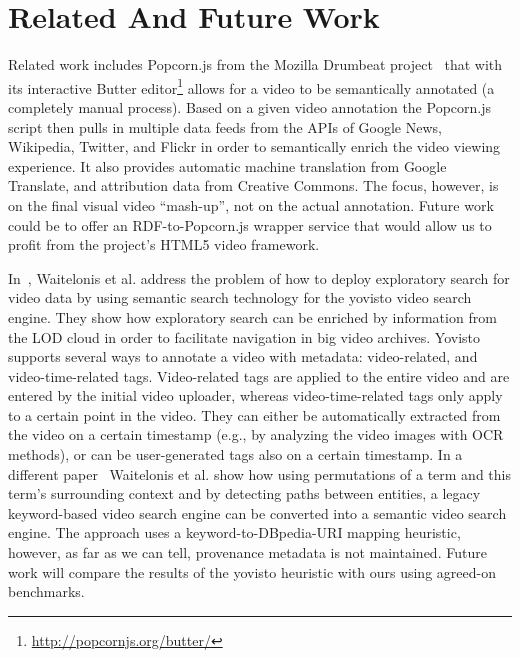 \documentclass{acm_proc_article-sp}
\begin{document}
\section{Related And Future Work}\label{sec:related}
Related work includes Popcorn.js from the Mozilla Drumbeat project~\cite{Drumbeat:Popcorn} that with its interactive Butter editor\footnote{\url{http://popcornjs.org/butter/}} allows for a video to be semantically annotated (a completely manual process). Based on a given video annotation the Popcorn.js script then pulls in multiple data feeds from the APIs of Google News, Wikipedia, Twitter, and Flickr in order to semantically enrich the video viewing experience. It also provides automatic machine translation from Google Translate, and attribution data from Creative Commons. The focus, however, is on the final visual video ``mash-up'', not on the actual annotation. Future work could be to offer an RDF-to-Popcorn.js wrapper service that would allow us to profit from the project's HTML5 video framework.

In~\cite{Sack:VideoSearch}, Waitelonis et al. address the problem of how to deploy exploratory search for video data by using semantic search technology for the yovisto video search engine. They show how exploratory search can be enriched by information from the LOD cloud in order to facilitate navigation in big video archives. Yovisto supports several ways to annotate a video with metadata: video-related, and video-time-related tags. Video-related tags are applied to the entire video and are entered by the initial video uploader, whereas video-time-related tags only apply to a certain point in the video. They can either be automatically extracted from the video on a certain timestamp (e.g., by analyzing the video images with OCR methods), or can be user-generated tags also on a certain timestamp. In a different paper~\cite{Sack:Use} Waitelonis et al. show how using permutations of a term and this term's surrounding context and by detecting paths between entities, a legacy keyword-based video search engine can be converted into a semantic video search engine. The approach uses a keyword-to-DBpedia-URI mapping heuristic, however, as far as we can tell, provenance metadata is not maintained. Future work will compare the results of the yovisto heuristic with ours using agreed-on benchmarks.
\end{document}
